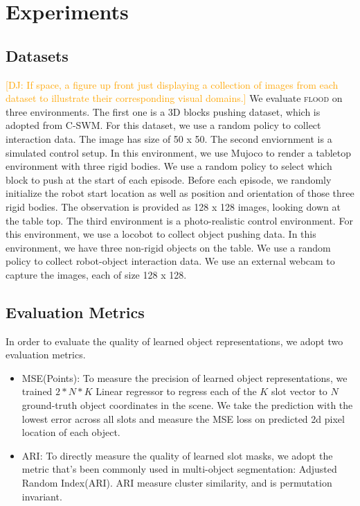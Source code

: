 \documentclass{article}
\newcommand{\jd}[1]{\textcolor{orange}{[DJ: #1]}}
\begin{document}
\section{Experiments}
\label{sec:experiments}

 

\subsection{Datasets}
\jd{If space, a figure up front just displaying a collection of images from each dataset to illustrate their corresponding visual domains.}
We evaluate \textsc{flood} on three environments. The first one is a 3D blocks pushing dataset, which is adopted from C-SWM. For this dataset, we use a random policy to collect interaction data. The image has size of 50 x 50. 
The second enviornment is a simulated control setup. In this environment, we use Mujoco to render a tabletop environment with three rigid bodies. We use a random policy to select which block to push at the start of each episode. Before each episode, we randomly initialize the robot start location as well as position and orientation of those three rigid bodies. The observation is provided as 128 x 128 images, looking down at the table top.
The third environment is a photo-realistic control environment. For this environment, we use a locobot to collect object pushing data. In this environment, we have three non-rigid objects on the table. We use a random policy to collect robot-object interaction data. We use an external webcam to capture the images, each of size 128 x 128.

\subsection{Evaluation Metrics}
In order to evaluate the quality of learned object representations, we adopt two evaluation metrics. 
\begin{itemize}
    \item MSE(Points): To measure the precision of learned object representations, we trained $2*N*K$ Linear regressor to regress each of the $K$ slot vector to $N$ ground-truth object coordinates in the scene. We take the prediction with the lowest error across all slots and measure the MSE loss on predicted 2d pixel location of each object. 
    \item ARI: To directly measure the quality of learned slot masks, we adopt the metric that's been commonly used in multi-object segmentation: Adjusted Random Index(ARI). ARI measure cluster similarity, and is permutation invariant. 
\end{itemize}
\end{document}
